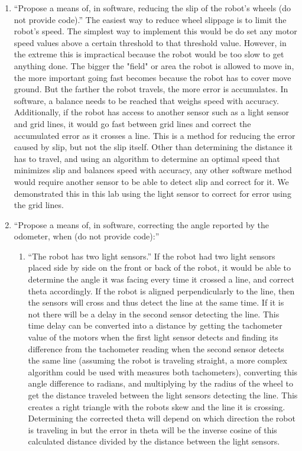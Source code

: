 \documentclass[twocolumn]{article}
\begin{document}
\begin{enumerate}

\item ``Propose a means of, in software, reducing the slip of the robot's wheels (do not provide code).\cite{lab2}'' The easiest way to reduce wheel slippage is to limit the robot's speed. The simplest way to implement this would be do set any motor speed values above a certain threshold to that threshold value. However, in the extreme this is impractical because the robot would be too slow to get anything done. The bigger the "field" or area the robot is allowed to move in, the more important going fast becomes because the robot has to cover move ground. But the farther the robot travels, the more error is accumulates. In software, a balance needs to be reached that weighs speed with accuracy. Additionally, if the robot has access to another sensor such as a light sensor and grid lines, it would go fast between grid lines and correct the accumulated error as it crosses a line. This is a method for reducing the error caused by slip, but not the slip itself. Other than determining the distance it has to travel, and using an algorithm to determine an optimal speed that minimizes slip and balances speed with accuracy, any other software method would require another sensor to be able to detect slip and correct for it. We demonstrated this in this lab using the light sensor to correct for error using the grid lines.

\item ``Propose a means of, in software, correcting the angle reported by the odometer, when (do not provide code):\cite{lab2}''

\begin{enumerate}
\item ``The robot has two light sensors.\cite{lab2}''
If the robot had two light sensors placed side by side on the front or back of the robot, it would be able to determine the angle it was facing every time it crossed a line, and correct theta accordingly. If the robot is aligned perpendicularly to the line, then the sensors will cross and thus detect the line at the same time. If it is not there will be a delay in the second sensor detecting the line. This time delay can be converted into a distance by getting the tachometer value of the motors when the first light sensor detects and finding its difference from the tachometer reading when the second sensor detects the same line (assuming the robot is traveling straight, a more complex algorithm could be used with measures both tachometers), converting this angle difference to radians, and multiplying by the radius of the wheel to get the distance traveled between the light sensors detecting the line. This creates a right triangle with the robots skew and the line it is crossing. Determining the corrected theta will depend on which direction the robot is traveling in but the error in theta will be the inverse cosine of this calculated distance divided by the distance between the light sensors.


\end{enumerate}
\end{enumerate}
\end{document}
